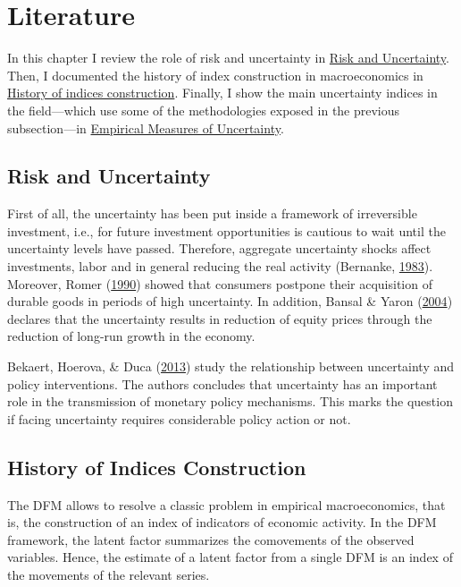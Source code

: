 \documentclass[12pt,twoside]{reedthesis}
\begin{document}
\hypertarget{literature}{%
\chapter{Literature}\label{literature}}

In this chapter I review the role of risk and uncertainty in \protect\hyperlink{risk-and-uncertainty}{Risk and Uncertainty}. Then, I documented the history of index construction in macroeconomics in \protect\hyperlink{history-of-indices-construction}{History of indices construction}. Finally, I show the main uncertainty indices in the field---which use some of the methodologies exposed in the previous subsection---in \protect\hyperlink{empirical-measures-of-uncertainty}{Empirical Measures of Uncertainty}.

\hypertarget{risk-and-uncertainty}{%
\section{Risk and Uncertainty}\label{risk-and-uncertainty}}

First of all, the uncertainty has been put inside a framework of irreversible investment, i.e., for future investment opportunities is cautious to wait until the uncertainty levels have passed. Therefore, aggregate uncertainty shocks affect investments, labor and in general reducing the real activity (Bernanke, \protect\hyperlink{ref-bernanke:1983}{1983}). Moreover, Romer (\protect\hyperlink{ref-romer:1990}{1990}) showed that consumers postpone their acquisition of durable goods in periods of high uncertainty. In addition, Bansal \& Yaron (\protect\hyperlink{ref-bansyaro:2004}{2004}) declares that the uncertainty results in reduction of equity prices through the reduction of long-run growth in the economy.

Bekaert, Hoerova, \& Duca (\protect\hyperlink{ref-bekaetal:2013}{2013}) study the relationship between uncertainty and policy interventions. The authors concludes that uncertainty has an important role in the transmission of monetary policy mechanisms. This marks the question if facing uncertainty requires considerable policy action or not.

\hypertarget{history-of-indices-construction}{%
\section{History of Indices Construction}\label{history-of-indices-construction}}

The DFM allows to resolve a classic problem in empirical macroeconomics, that is, the construction of an index of indicators of economic activity. In the DFM framework, the latent factor summarizes the comovements of the observed variables. Hence, the estimate of a latent factor from a single DFM is an index of the movements of the relevant series.
\end{document}
